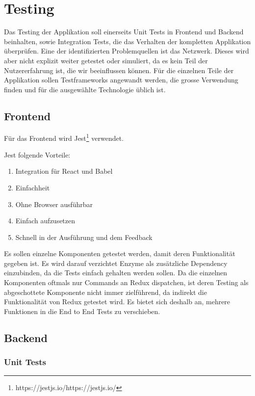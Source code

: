\section{Testing}

Das Testing der Applikation soll einerseits Unit Tests in Frontend und Backend beinhalten, sowie Integration Tests, die das Verhalten der kompletten Applikation \"uberpr\"ufen.
Eine der identifizierten Problemquellen ist das Netzwerk.
Dieses wird aber nicht explizit weiter getestet oder simuliert, da es kein Teil der Nutzererfahrung ist, die wir beeinflussen k\"onnen.
F\"ur die einzelnen Teile der Applikation sollen Testframeworks angewandt werden, die grosse Verwendung finden und f\"ur die ausgew\"ahlte Technologie \"ublich ist.

\subsection{Frontend}
F\"ur das Frontend wird Jest\footnote{{https://jestjs.io/}{https://jestjs.io/}} verwendet.

Jest folgende Vorteile:

\begin{enumerate}
    \item Integration f\"ur React und Babel
    \item Einfachheit
    \item Ohne Browser ausf\"uhrbar
    \item Einfach aufzusetzen
    \item Schnell in der Ausf\"uhrung und dem Feedback
\end{enumerate}

Es sollen einzelne Komponenten getestet werden, damit deren Funktionalit\"at gegeben ist.
Es wird darauf verzichtet Enzyme als zus\"atzliche Dependency einzubinden, da die Tests einfach gehalten werden sollen.
Da die einzelnen Komponenten oftmals nur Commands an Redux dispatchen, ist deren Testing als abgeschottete Komponente nicht immer zielf\"uhrend, da indirekt die Funktionalit\"at von Redux getestet wird.
Es bietet sich deshalb an, mehrere Funktionen in die End to End Tests zu verschieben.

\subsection{Backend}

\subsubsection{Unit Tests}

